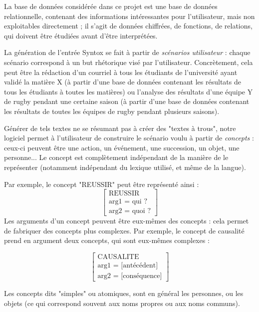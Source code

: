 \documentclass[12pt]{report}
\begin{document}
\bigskip

La base de données considérée dans ce projet est une base de données relationnelle, contenant des informations intéressantes pour l'utilisateur, mais non exploitables directement ; il s'agit de données chiffrées, de fonctions, de relations, qui doivent être étudiées avant d'être interprétées.

\bigskip

La génération de l'entrée Syntox se fait à partir de \emph{scénarios utilisateur} : chaque scénario correspond à un but rhétorique visé par l'utilisateur. Concrètement, cela peut être la rédaction d'un courriel à tous les étudiants de l'université ayant validé la matière X (à partir d'une base de données contenant les résultats de tous les étudiants à toutes les matières) ou l'analyse des résultats d'une équipe Y de rugby pendant une certaine saison (à partir d'une base de données contenant les résultats de toutes les équipes de rugby pendant plusieurs saisons).

\bigskip

Générer de tels textes ne se résumant pas à créer des "textes à trous", notre logiciel permet à l'utilisateur de construire le scénario voulu à partir de \emph{concepts} : ceux-ci peuvent être une action, un événement, une succession, un objet, une personne... Le concept est complètement indépendant de la manière de le représenter (notamment indépendant du lexique utilisé, et même de la langue).

Par exemple, le concept "REUSSIR" peut être représenté ainsi :
$$\begin{bmatrix}
\text{REUSSIR} \\ \text{arg1 = qui\ ?} \\ \text{arg2 = quoi\ ?}
\end{bmatrix}
$$
Les arguments d'un concept peuvent être eux-mêmes des concepts : cela permet de fabriquer des concepts plus complexes.
Par exemple, le concept de causalité prend en argument deux concepts, qui sont eux-mêmes complexes :

$$\begin{bmatrix}
\text{CAUSALITE} \\ \text{arg1 = [antécédent]} \\ \text{arg2 = [conséquence]}
\end{bmatrix}
$$

Les concepts dits "simples" ou atomiques, sont en général les personnes, ou les objets (ce qui correspond souvent aux noms propres ou aux noms communs).
\end{document}
